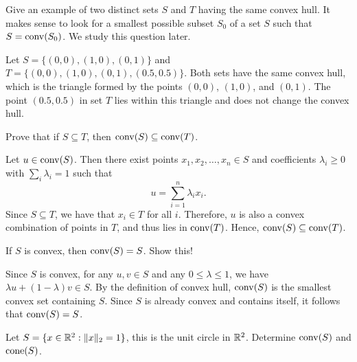 \begin{exercise}
  Give an example of two distinct sets $S$ and $T$ having the same convex hull.
  It makes sense to look for a smallest possible subset $S_0$ of a set $S$ such that $S = \operatorname*{conv}(S_0)$.
  We study this question later.
\end{exercise}

\begin{solution}
  Let $S = \{(0, 0), (1, 0), (0, 1)\}$ and $T = \{(0, 0), (1, 0), (0, 1), (0.5, 0.5)\}$.
  Both sets have the same convex hull, which is the triangle formed by the points $(0, 0)$, $(1, 0)$, and $(0, 1)$.
  The point $(0.5, 0.5)$ in set $T$ lies within this triangle and does not change the convex hull.
\end{solution}

\begin{exercise}
  Prove that if $S \subseteq T$, then $\operatorname*{conv}(S) \subseteq \operatorname*{conv}(T)$.
\end{exercise}

\begin{solution}
  Let $u \in \operatorname*{conv}(S)$.
  Then there exist points $x_1, x_2, \ldots, x_n \in S$ and coefficients $\lambda_i \geq 0$ with $\sum_i \lambda_i = 1$ such that
  \begin{equation}
    u = \sum_{i=1}^n \lambda_i x_i.
  \end{equation}
  Since $S \subseteq T$, we have that $x_i \in T$ for all $i$.
  Therefore, $u$ is also a convex combination of points in $T$, and thus lies in $\operatorname*{conv}(T)$.
  Hence, $\operatorname*{conv}(S) \subseteq \operatorname*{conv}(T)$.
\end{solution}

\begin{exercise}
  If $S$ is convex, then $\operatorname*{conv}(S) = S$.
  Show this!
\end{exercise}

\begin{solution}
  Since $S$ is convex, for any $u, v \in S$ and any $0 \leq \lambda \leq 1$, we have $\lambda u + (1 - \lambda) v \in S$.
  By the definition of convex hull, $\operatorname*{conv}(S)$ is the smallest convex set containing $S$.
  Since $S$ is already convex and contains itself, it follows that $\operatorname*{conv}(S) = S$.
\end{solution}

\begin{exercise}
  Let $S = \{ x \in \mathbb{R}^2 : \lVert x\rVert_2 = 1 \}$, this is the unit circle in $\mathbb{R}^2$.
  Determine $\operatorname*{conv}(S)$ and $\operatorname*{cone}(S)$.
\end{exercise}

